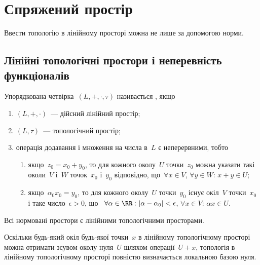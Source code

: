 \chapter{Спряжений простір}

Ввести топологію в лінійному просторі можна не лише за допомогою норми.

\section{Лінійні топологічні простори і неперевність функціоналів}

\begin{definition}
    Упорядкована четвірка~$(L, +, \cdot, \tau)$ називається , якщо
    \begin{enumerate}
        \item $(L, +, \cdot)$~--- дійсний лінійний простір;
        \item $(L, \tau)$~--- топологічний простір;
        \item операція додавання і множення на числа в~$L$ є
        неперервними, тобто
        \begin{enumerate}
            \item якщо~$z_0 = x_0 + y_0$, то для кожного околу~$U$ точки~$z_0$
            можна указати такі околи~$V$ і~$W$ точок~$x_0$ і~$y_0$ відповідно,
            що~$\forall x \in V$, $\forall y \in W$: $x + y \in U$;
            \item якщо~$\alpha_0 x_0 = y_0$, то для кожного околу~$U$ точки~$y_0$
            існує окіл~$V$ точки~$x_0$ і таке число~$\epsilon > 0$, що
           ~$\forall \alpha \in \RR: |\alpha - \alpha_0| < \epsilon$, $\forall x \in V$: $\alpha x \in U$.
        \end{enumerate}
    \end{enumerate}
\end{definition}

\begin{example}
    Всі нормовані простори є лінійними топологічними просторами.
\end{example}

\begin{remark}
    Оскільки будь-який окіл будь-якої точки~$x$ в лінійному топологічному просторі можна отримати зсувом околу нуля~$U$ шляхом операції~$U + x$, топологія в лінійному топологічному просторі повністю визначається локальною базою нуля.
\end{remark}

